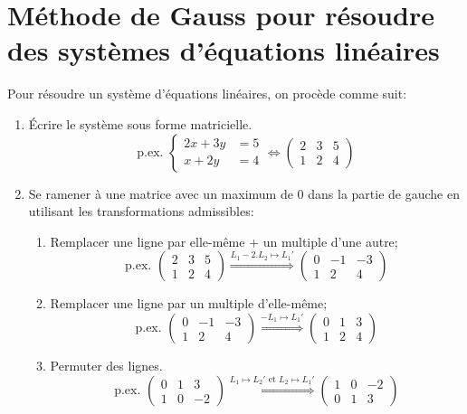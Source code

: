 \section{Méthode de Gauss pour résoudre des systèmes d'équations linéaires}

Pour résoudre un système d'équations linéaires, on procède comme suit:
\begin{enumerate}
\item Écrire le système sous forme matricielle. \[\text{p.ex. } \begin{cases} 2x+3y &= 5 \\ x+2y &= 4 \end{cases} \Leftrightarrow \left(\begin{array}{cc|c} 2 & 3 & 5 \\ 1 & 2 & 4 \end{array}\right) \]
\item Se ramener à une matrice avec un maximum de $0$ dans la partie de gauche en utilisant les transformations admissibles:
\begin{enumerate}
\item Remplacer une ligne par elle-même + un multiple d'une autre;
\[\text{p.ex. } \left(\begin{array}{cc|c} 2 & 3 & 5 \\ 1 & 2 & 4 \end{array}\right)  \stackrel{L_1  - 2. L_2 \mapsto L_1'}{\Longrightarrow} \left(\begin{array}{cc|c} 0 & -1 & -3 \\ 1 & 2 & 4 \end{array}\right) \]
\item Remplacer une ligne par un multiple d'elle-même;
\[\text{p.ex. } \left(\begin{array}{cc|c} 0 & -1 & -3 \\ 1 & 2 & 4 \end{array}\right)  \stackrel{-L_1  \mapsto L_1'}{\Longrightarrow} \left(\begin{array}{cc|c} 0 & 1 & 3 \\ 1 & 2 & 4 \end{array}\right) \]
\item Permuter des lignes.
\[\text{p.ex. } \left(\begin{array}{cc|c} 0 & 1 & 3 \\ 1 & 0 & -2 \end{array}\right)  \stackrel{L_1  \mapsto L_2' \text{ et } L_2  \mapsto L_1'}{\Longrightarrow} \left(\begin{array}{cc|c} 1 & 0 & -2 \\ 0 & 1 & 3  \end{array}\right) \]

\end{enumerate}
\end{enumerate}
